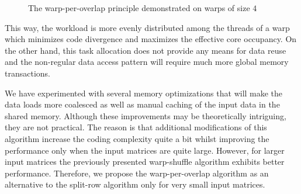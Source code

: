 \begin{figure}[ht]
	\centering
	\def\svgwidth{0.5\textwidth}
	\fontsize{7}{9}\selectfont
	
	\caption{The warp-per-overlap principle demonstrated on warps of size $4$}
	\label{fig:warp-per-overlap}
\end{figure}

This way, the workload is more evenly distributed among the threads of a warp which minimizes code divergence and maximizes the effective core occupancy. On the other hand, this task allocation does not provide any means for data reuse and the non-regular data access pattern will require much more global memory transactions.

We have experimented with several memory optimizations that will make the data loads more coalesced as well as manual caching of the input data in the shared memory. Although these improvements may be theoretically intriguing, they are not practical. The reason is that additional modifications of this algorithm increase the coding complexity quite a bit whilst improving the performance only when the input matrices are quite large. However, for larger input matrices the previously presented warp-shuffle algorithm exhibits better performance. Therefore, we propose the warp-per-overlap algorithm as an alternative to the split-row algorithm only for very small input matrices.
